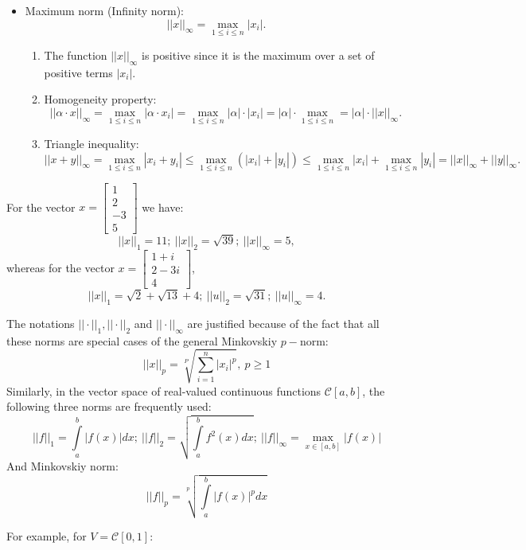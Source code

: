     \begin{itemize}
        \item Maximum norm (Infinity norm):
        \[
            ||x||_\infty = \max\limits_{1 \leq i \leq n} |x_i|.  
        \]
        \begin{enumerate}
            \item The function $||x||_\infty$ is positive since it is the maximum over a set of positive terms $|x_i|$.
            \item Homogeneity property:
            \[
                ||\alpha\cdot x ||_{\infty} = \max\limits_{1 \leq i \leq n} |\alpha\cdot x_i| = \max\limits_{1 \leq i \leq n} |\alpha| \cdot |x_i| = |\alpha| \cdot \max\limits_{1 \leq i \leq n} = |\alpha|\cdot ||x||_\infty. 
            \]
            \item Triangle inequality:
            \[
                ||x+y||_{\infty} = \max\limits_{1 \leq i \leq n} |x_i + y_i| \leq \max\limits_{1 \leq i \leq n} \left(|x_i| + |y_i|\right) \leq \max\limits_{1 \leq i \leq n} |x_i| + \max\limits_{1 \leq i \leq n} |y_i| = ||x||_\infty + ||y||_\infty.
            \]
        \end{enumerate}
    \end{itemize}

\Ex For the vector $x = \begin{bmatrix}
    1 \\
    2 \\ 
    -3 \\
    5
\end{bmatrix}$ we have:
\[
    ||x||_1 = 11; \ ||x||_2 = \sqrt{39}; \ ||x||_\infty = 5, 
\]
whereas for the vector $x = \begin{bmatrix}
    1+i \\
    2-3i\\
    4
\end{bmatrix}$,
\[
    ||x||_1 = \sqrt{2} + \sqrt{13} + 4; \ ||u||_2 = \sqrt{31}; \ ||u||_\infty = 4.  
\]

The notations $||\cdot ||_1, ||\cdot||_2$ and $||\cdot ||_\infty$ are justified because of the fact that all these norms are special cases of the general Minkovskiy $p-$norm:
\[
    ||x||_p = \sqrt[P]{\sum\limits_{i=1}^n |x_i|^p}, \ p\geq 1
\]
Similarly, in the vector space of real-valued continuous functions $\mathcal{C}[a,b]$, the following three norms are frequently used:
\[
    ||f||_1 = \int\limits_{a}^b |f(x)| dx; \ ||f||_2 = \sqrt{\int\limits_a^b f^2(x)dx}; \ ||f||_\infty = \max\limits_{x\in [a,b]} |f(x)|  
\]
And Minkovskiy norm:
\[
    ||f||_p = \sqrt[p]{\int\limits_{a}^b |f(x)|^p dx}  
\]
\par
For example, for $V = \mathcal{C}[0,1]$:

